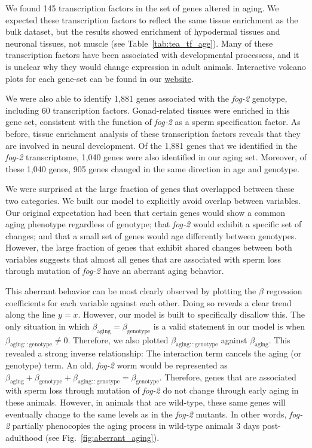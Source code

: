 \documentclass[10pt,letterpaper,twocolumn]{article}
\newcommand{\fog}{\emph{fog-2}}
\newcommand{\fogn}{1,881}
\newcommand{\coexpressed}{905}
\newcommand{\intersectn}{1,040}
\newcommand{\tfaging}{145}
\newcommand{\tffog}{60}
\newcommand{\webref}{
\href{https://wormlabcaltech.github.io/Angeles_Leighton_2016/}{website}}
\begin{document}
We found \tfaging{} transcription factors in the set of genes altered in aging. We expected these transcription factors to reflect the same tissue enrichment as the bulk dataset, but the results showed enrichment of hypodermal tissues and neuronal tissues, not muscle (see Table~\ref{tab:tea_tf_age}). Many of these transcription factors have been  associated with developmental processess, and it is unclear why they would change expression in adult animals. Interactive volcano plots for each gene-set can be found in our \webref{}.

We were also able to identify \fogn{} genes associated with the \fog{} genotype, including \tffog{} transcription factors. Gonad-related tissues were enriched in this gene set, consistent with the function of \fog{} as a sperm specification factor. As before, tissue enrichment analysis of these transcription factors reveals that they are involved in neural development. Of the \fogn{} genes that we identified in the \fog{} transcriptome, \intersectn{} genes were also identified in our aging set. Moreover, of these \intersectn{}  genes, \coexpressed{} genes changed in the same direction in age and genotype.

We were surprised at the large fraction of genes that overlapped between these two categories. We built our model to explicitly avoid overlap between variables. Our original expectation had been that certain genes would show a common aging phenotype regardless of genotype; that \fog{} would exhibit a specific set of changes; and that a small set of genes would age differently between genotypes. However, the large fraction of genes that exhibit shared changes between both variables suggests that almost all genes that are associated with sperm loss through mutation of \fog{} have an aberrant aging behavior.

This aberrant behavior can be most clearly observed by plotting the $\beta$ regression coefficients for each variable against each other. Doing so reveals a clear trend along the line $y=x$. However, our model is built to specifically disallow this. The only situation in which $\beta_\mathrm{aging} = \beta_\mathrm{genotype}$ is a valid statement in our model is when $\beta_\mathrm{aging::genotype} \neq 0$. Therefore, we also plotted $\beta_\mathrm{aging::genotype}$ against $\beta_\mathrm{aging}$. This revealed a strong inverse relationship: The interaction term cancels the aging (or genotype) term. An old, \fog{} worm would be represented as
$\beta_\mathrm{aging} +\beta_\mathrm{genotype} + \beta_\mathrm{aging::genotype} = \beta_\mathrm{genotype}$.
Therefore, genes that are associated with sperm loss through mutation of \fog{} do not change through early aging in these animals. However, in animals that are wild-type, these same genes will eventually change to the same levels as in the \fog{} mutants. In other words, \fog{} partially phenocopies the aging process in wild-type animals 3 days post-adulthood (see Fig.~\ref{fig:aberrant_aging}).
\end{document}
